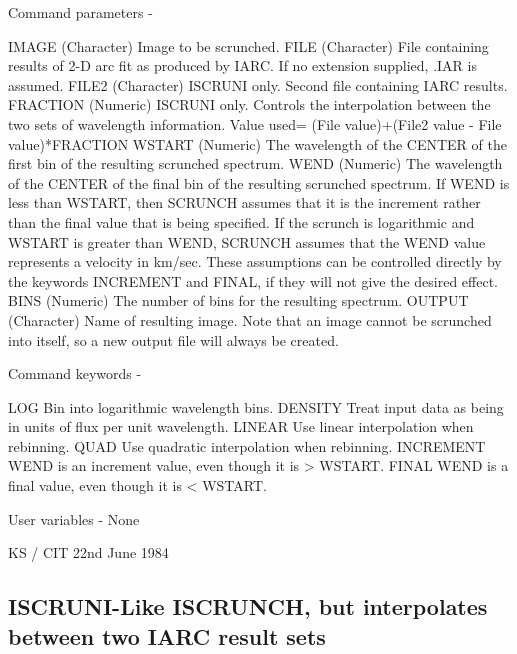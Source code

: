 \begin{description}
\begin{description}
\begin{terminalv}
 Command parameters -

 IMAGE      (Character) Image to be scrunched.
 FILE       (Character) File containing results of 2-D arc fit
            as produced by IARC.  If no extension supplied,
            .IAR is assumed.
 FILE2      (Character) ISCRUNI only. Second file containing
            IARC results.
 FRACTION   (Numeric) ISCRUNI only.  Controls the interpolation
            between the two sets of wavelength information.
            Value used=
                (File value)+(File2 value - File value)*FRACTION
 WSTART     (Numeric) The wavelength of the CENTER of the first
            bin of the resulting scrunched spectrum.
 WEND       (Numeric) The wavelength of the CENTER of the final
            bin of the resulting scrunched spectrum.  If WEND is
            less than WSTART, then SCRUNCH assumes that it is the
            increment rather than the final value that is being
            specified.  If the scrunch is logarithmic and WSTART
            is greater than WEND, SCRUNCH assumes that the WEND
            value represents a velocity in km/sec.  These
            assumptions can be controlled directly by the keywords
            INCREMENT and FINAL, if they will not give the desired
            effect.
 BINS       (Numeric) The number of bins for the resulting spectrum.
 OUTPUT     (Character) Name of resulting image.  Note that an image
            cannot be scrunched into itself, so a new output file
            will always be created.

 Command keywords -

 LOG        Bin into logarithmic wavelength bins.
 DENSITY    Treat input data as being in units of flux per unit
            wavelength.
 LINEAR     Use linear interpolation when rebinning.
 QUAD       Use quadratic interpolation when rebinning.
 INCREMENT  WEND is an increment value, even though it is > WSTART.
 FINAL      WEND is a final value, even though it is < WSTART.

 User variables - None

                                     KS / CIT 22nd June 1984
\end{terminalv}
\end{description}
\subsection{ISCRUNI-\label{ISCRUNI}Like ISCRUNCH, but interpolates between two IARC result sets}
\begin{description}


\end{description}
\end{description}
